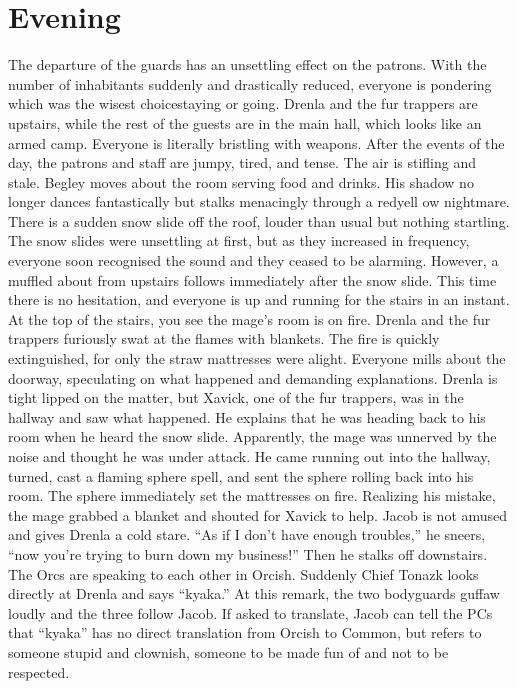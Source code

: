 \documentclass[a5paper,11pt,twoside]{book}
\begin{document}
{{{{{\section*{Evening} The departure of the guards has an unsettling effect on the patrons.
With the number of inhabitants suddenly and drastically reduced, everyone is pondering which was the wisest choicestaying or going.
Drenla and the fur trappers are upstairs, while the rest of the guests are in the main hall, which looks like an armed camp.
Everyone is literally bristling with weapons.
After the events of the day, the patrons and staff are jumpy, tired, and tense.
The air is stifling and stale.
Begley moves about the room serving food and drinks.
His shadow no longer dances fantastically but stalks menacingly through a redyell ow nightmare.
There is a sudden snow slide off the roof, louder than usual but nothing startling.
The snow slides were unsettling at first, but as they increased in frequency, everyone soon recognised the sound and they ceased to be alarming.
However, a muffled about from upstairs follows immediately after the snow slide.
This time there is no hesitation, and everyone is up and running for the stairs in an instant.
At the top of the stairs, you see the mage’s room is on fire.
Drenla and the fur trappers furiously swat at the flames with blankets.
The fire is quickly extinguished, for only the straw mattresses were alight.
Everyone mills about the doorway, speculating on what happened and demanding explanations.
Drenla is tight lipped on the matter, but Xavick, one of the fur trappers, was in the hallway and saw what happened.
He explains that he was heading back to his room when he heard the snow slide.
Apparently, the mage was unnerved by the noise and thought he was under attack.
He came running out into the hallway, turned, cast a flaming sphere spell, and sent the sphere rolling back into his room.
The sphere immediately set the mattresses on fire.
Realizing his mistake, the mage grabbed a blanket and shouted for Xavick to help.
Jacob is not amused and gives Drenla a cold stare.
“As if I don’t have enough troubles,” he sneers, “now you’re trying to burn down my business!” Then he  stalks off downstairs.
The Orcs are speaking to each other in Orcish.
Suddenly Chief Tonazk looks directly at Drenla and says “kyaka.” At this remark, the two bodyguards guffaw loudly and the three follow Jacob.
If asked to translate, Jacob can tell the PCs that “kyaka” has no direct translation from Orcish to Common, but refers to someone stupid and clownish, someone to be made fun of and not to be respected.

}}}}}
\end{document}
